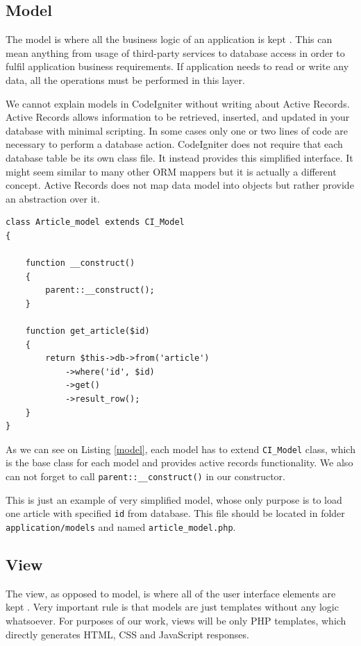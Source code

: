 \subsection{Model}
The model is where all the business logic of an application is kept \cite{phpmvc}. This can mean anything from usage of third-party services to database access in order to fulfil application business requirements. If application needs to read or write any data, all the operations must be performed in this layer.

We cannot explain models in CodeIgniter without writing about Active Records. Active Records allows information to be retrieved, inserted, and updated in your database with minimal scripting. In some cases only one or two lines of code are necessary to perform a database action. CodeIgniter does not require that each database table be its own class file. It instead provides this simplified interface\cite{codeigniter}. It might seem similar to many other ORM mappers but it is actually a different concept. Active Records does not map data model into objects but rather provide an abstraction over it.

\begin{lstlisting}[label={model}, caption={Article model}]
class Article_model extends CI_Model
{

    function __construct()
    {
        parent::__construct();
    }

    function get_article($id)
    {
        return $this->db->from('article')
            ->where('id', $id)
            ->get()
            ->result_row();
    }
}
\end{lstlisting}

As we can see on Listing \ref{model}, each model has to extend \texttt{CI\_Model} class, which is the base class for each model and provides active records functionality. We also can not forget to call \texttt{parent::\_\_construct()} in our constructor.

This is just an example of very simplified model, whose only purpose is to load one article with specified \texttt{id} from database. This file should be located in folder \texttt{application/models} and named \texttt{article\_model.php}.

\subsection{View}
The view, as opposed to model, is where all of the user interface elements are kept \cite{phpmvc}. Very important rule is that models are just templates without any logic whatsoever. For purposes of our work, views will be only PHP templates, which directly generates HTML, CSS and JavaScript responses.

